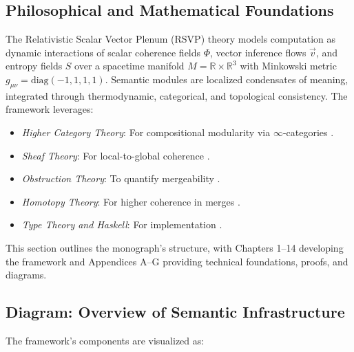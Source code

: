 \documentclass[12pt]{article}
\begin{document}
\subsection{Philosophical and Mathematical Foundations}
The Relativistic Scalar Vector Plenum (RSVP) theory models computation as dynamic interactions of scalar coherence fields $\Phi$, vector inference flows $\vec{v}$, and entropy fields $S$ over a spacetime manifold $M = \mathbb{R} \times \mathbb{R}^3$ with Minkowski metric $g_{\mu\nu} = \text{diag}(-1, 1, 1, 1)$. Semantic modules are localized condensates of meaning, integrated through thermodynamic, categorical, and topological consistency. The framework leverages:
\begin{itemize}[itemsep=0pt]
    \item \emph{Higher Category Theory}: For compositional modularity via $\infty$-categories \cite{lurie2009higher}.
    \item \emph{Sheaf Theory}: For local-to-global coherence \cite{mac2013categories}.
    \item \emph{Obstruction Theory}: To quantify mergeability \cite{illusie1971complexe}.
    \item \emph{Homotopy Theory}: For higher coherence in merges \cite{lurie2009higher}.
    \item \emph{Type Theory and Haskell}: For implementation \cite{milewski2019category}.
\end{itemize}
This section outlines the monograph’s structure, with Chapters 1–14 developing the framework and Appendices A–G providing technical foundations, proofs, and diagrams.

\subsection{Diagram: Overview of Semantic Infrastructure}
The framework’s components are visualized as:

\begin{center}
\end{center}
\end{document}
